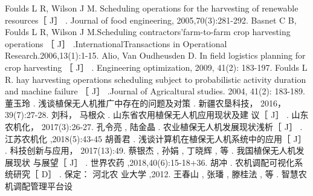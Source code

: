 \documentclass[UTF8,a4paper,10pt,nocolorlinks]{ctexart}
\begin{document}
\begin{thebibliography}{99}
\addtolength{\itemsep}{-2ex} %
Foulds L R, Wilson J M. Scheduling operations for the
harvesting of renewable resources［ J］ . Journal of
food engineering, 2005,70(3):281-292.
 Basnet C B, Foulds L R, Wilson J M.Scheduling
contractors’farm-to-farm crop harvesting operations
［ J］ .InternationalTransactions in Operational
Research.2006,13(1):1-15.
 Alio, Van Oudheusden D. In field logistics planning for
crop harvesting ［ J］ . Engineering optimization, 2009,
41(2): 183-197.
 Foulds L R. hay harvesting operations scheduling
subject to probabilistic activity duration and machine
failure ［ J］ .Journal of Agricaltural studies. 2004,
41(2): 183-189.
 董玉玲 . 浅谈植保无人机推广中存在的问题及对策
 . 新疆农垦科技， 2016， 39(7):27-28.
 刘科， 马根众 . 山东省农用植保无人机应用现状及建
议［ J］ . 山东农机化， 2017(3):26-27.
 孔令亮 , 陆金晶 . 农业植保无人机发展现状浅析［ J］ .
江苏农机化 ,2018(5):43-45
 胡善君 . 浅谈计算机在植保无人机系统中的应用［ J］ .
科技创新与应用， 2017(13):49.
 蔡银杰 , 孙娟 , 丁晓辉 , 等 . 我国植保无人机发展现状
与展望［ J］ . 世界农药 ,2018,40(6):15-18+36.
 胡冲 . 农机调配可视化系统研究［ D］ . 保定： 河北农
业大学 ,2012.
 王春山 , 张璠 , 滕桂法 , 等 . 智慧农机调配管理平台设

\end{thebibliography}
\end{document}
